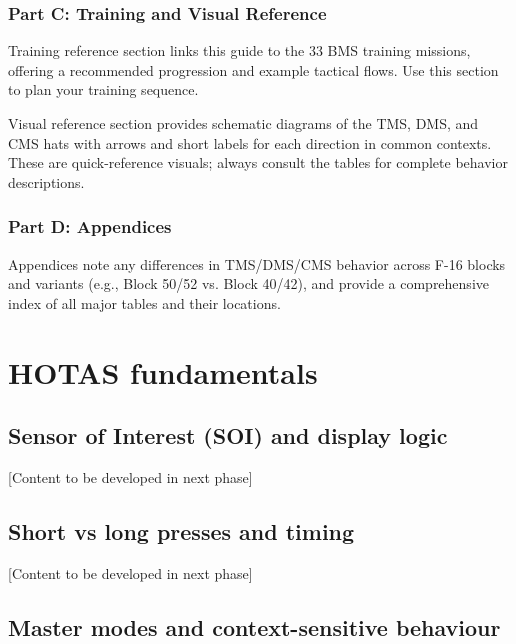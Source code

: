\documentclass[11pt,a4paper]{article}
\begin{document}
\subsubsection{Part C: Training and Visual Reference}

Training reference section links this guide to the 33 BMS training missions, offering a recommended progression and example tactical flows. Use this section to plan your training sequence.

Visual reference section provides schematic diagrams of the TMS, DMS, and CMS hats with arrows and short labels for each direction in common contexts. These are quick-reference visuals; always consult the tables for complete behavior descriptions.

\subsubsection{Part D: Appendices}

Appendices note any differences in TMS/DMS/CMS behavior across F-16 blocks and variants (e.g., Block 50/52 vs. Block 40/42), and provide a comprehensive index of all major tables and their locations.


\section{HOTAS fundamentals}

\subsection{Sensor of Interest (SOI) and display logic}

[Content to be developed in next phase]

\subsection{Short vs long presses and timing}

[Content to be developed in next phase]

\subsection{Master modes and context-sensitive behaviour}
\end{document}
